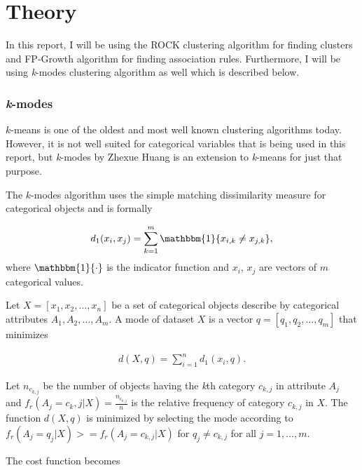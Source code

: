 \documentclass[result.tex]{subfiles}
\begin{document}
\section*{\centering Theory}

In this report, I will be using the ROCK clustering algorithm \cite{guha2000rock} for finding clusters and FP-Growth algorithm \cite{han2000mining} for finding association rules. Furthermore, I will be using \textit{k}-modes clustering algorithm as well which is described below.

\subsubsection*{\textit{k}-modes}

$k$-means is one of the oldest and most well known clustering algorithms today. However, it is not well suited for categorical variables that is being used in this report, but \textit{k}-modes by Zhexue Huang \cite{huang1998extensions} is an extension to \textit{k}-means for just that purpose.

The $k$-modes algorithm uses the simple matching dissimilarity measure for categorical objects and is formally

\begin{align*}
d_1(x_i, x_j) = \sum_{k=1}^{m}  \mathbbm{1} \{ x_{i,k} \neq x_{j,k} \},
\end{align*}
where $\mathbbm{1} \{ \cdot \}$ is the indicator function and $x_i$, $x_j$ are vectors of $m$ categorical values.

Let $X = \left[ x_1, x_2, \ldots, x_n \right]$ be a set of categorical objects describe by categorical attributes $A_1, A_2, \ldots, A_m$. A mode of dataset $X$ is a vector $q = \left[ q_1, q_2, \ldots, q_m \right]$ that minimizes

\begin{align*}
d(X, q) = \sum_{i=1}^{n} d_1(x_i, q).
\end{align*}

Let $n_{c_{k, j}}$ be the number of objects having the \textit{k}th category $c_{k,j}$ in attribute $A_j$ and $f_r(A_j = c_k,j | X) = \frac{n_{c_{k,j}}}{n}$ is the relative frequency of category $c_{k,j}$ in $X$. The function $d(X, q)$ is minimized by selecting the mode according to $f_r(A_j = q_j | X) >= f_r(A_j = c_{k,j} | X)$ for $q_j \neq c_{k,j}$ for all $j = 1, \ldots, m$.

The cost function becomes
\end{document}
